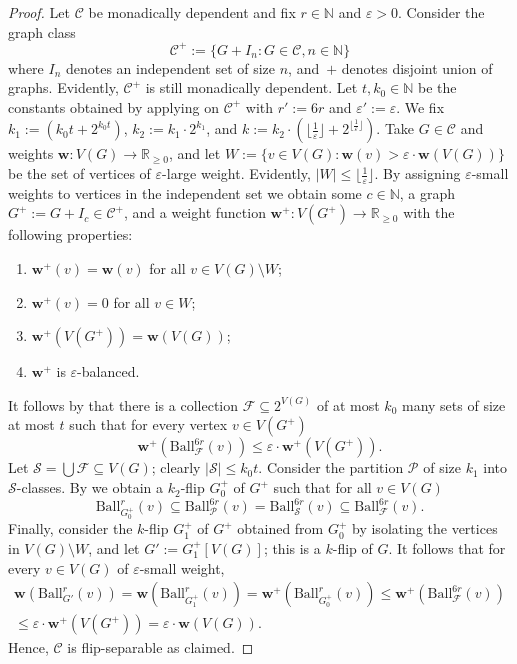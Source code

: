 \documentclass[a4paper,UKenglish,cleveref, autoref, thm-restate]{lipics-v2021}
\newcommand{\eps}{\varepsilon}
\newcommand{\R}{\mathbb{R}}
\renewcommand{\SS}{\mathcal{S}}
\newcommand{\N}[0]{\mathrm{\mathbb{N}}}
\newcommand{\floor}[1]{\lfloor #1 \rfloor}
\newcommand{\weight}{\mathbf{w}}
\newcommand{\CC}{\mathcal{C}}
\newcommand{\C}{\CC}
\newcommand{\FF}{\mathcal{F}}
\newcommand{\PP}{\mathcal{P}}
\renewcommand{\le}{\leqslant}
\renewcommand{\leq}{\le}
\renewcommand{\ge}{\geqslant}
\renewcommand{\geq}{\ge}
\newcommand{\Ball}{\mathrm{Ball}}
\begin{document}
\begin{proof}
    Let $\C$ be monadically dependent and fix $r \in \N$ and $\varepsilon > 0$. Consider the graph class 
    \[ \CC^+:=\{G + I_n : G \in \CC, n \in \N\} \] 
    where $I_n$ denotes an independent set of size $n$, and~$+$ denotes disjoint union of graphs. Evidently, $\CC^+$ is still monadically dependent. 
    Let $t,k_0 \in \N$ be the constants obtained by applying  on $\CC^+$ with $r':=6r$ and $\eps':=\eps$. We fix $k_1:= (k_0t + 2^{k_0t})$, $k_2:=k_1\cdot 2^{k_1}$, and $k:=k_2\cdot(\floor{\frac{1}{\varepsilon}}+2^{\floor{\frac{1}{\varepsilon}}})$. Take $G \in \C$ and weights $\weight: V(G) \to \R_{\geq 0}$, and let $W:= \{v \in V(G): \weight(v)>\eps\cdot \weight(V(G))\}$ be the set of vertices of $\eps$-large weight. Evidently, $|W|\leq \floor{\frac{1}{\eps}}$. By assigning $\eps$-small weights to vertices in the independent set we obtain some $c \in \N$, a graph $G^+:=G + I_c \in \CC^+$, and a weight function $\weight^+:V(G^+) \to \R_{\geq 0}$ with the following properties:
    \begin{enumerate}
        \item $\weight^+(v)=\weight(v)$ for all $v \in V(G)\setminus W$;
        \item $\weight^+(v)=0$ for all $v \in W$;
        \item $\weight^+(V(G^+))=\weight(V(G))$;
        \item $\weight^+$ is $\eps$-balanced.
    \end{enumerate}
    It follows by  that there is a collection $\FF\subseteq 2^{V(G)}$ of at most $k_0$ many sets of size at most $t$ such that for every vertex $v \in V(G^+)$
    \[ \weight^+(\Ball_\FF^{6r}(v)) \leq \eps \cdot \weight^+(V(G^+)).\]
    Let $\SS = \bigcup \FF \subseteq V(G)$; clearly $|\SS|\leq k_0t$. Consider the partition $\PP$ of size $k_1$ into $\SS$-classes. By  we obtain a $k_2$-flip $G^+_0$ of $G^+$ such that for all $v\in V(G)$
    \[ \Ball^r_{G^+_0}(v) \subseteq \Ball^{6r}_\PP(v)=\Ball_\SS^{6r}(v)\subseteq \Ball_\FF^{6r}(v).\]
    Finally, consider the $k$-flip $G_1^+$ of $G^+$ obtained from $G^+_0$ by isolating the vertices in $V(G)\setminus W$, and let $G':=G^+_1[V(G)]$; this is a $k$-flip of $G$. It follows that for every $v \in V(G)$ of $\eps$-small weight,
    \begin{gather*}
    \weight(\Ball^r_{G'}(v))= \weight(\Ball^r_{G^+_1}(v)) = \weight^+(\Ball^r_{G^+_0}(v)) \leq \weight^+(\Ball_\FF^{6r}(v))\\ \leq \eps \cdot \weight^+(V(G^+)) = \eps \cdot \weight(V(G)).
    \end{gather*}
    Hence, $\C$ is flip-separable as claimed. 
\end{proof}
\end{document}
